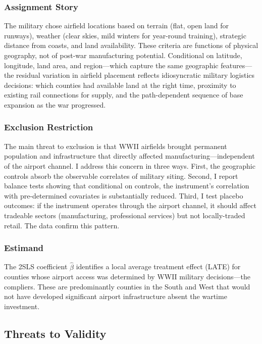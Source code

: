 \documentclass[12pt]{article}
\begin{document}
\subsubsection*{Assignment Story} The military chose airfield locations based on terrain (flat, open land for runways), weather (clear skies, mild winters for year-round training), strategic distance from coasts, and land availability. These criteria are functions of physical geography, not of post-war manufacturing potential. Conditional on latitude, longitude, land area, and region---which capture the same geographic features---the residual variation in airfield placement reflects idiosyncratic military logistics decisions: which counties had available land at the right time, proximity to existing rail connections for supply, and the path-dependent sequence of base expansion as the war progressed.

\subsubsection*{Exclusion Restriction} The main threat to exclusion is that WWII airfields brought permanent population and infrastructure that directly affected manufacturing---independent of the airport channel. I address this concern in three ways. First, the geographic controls absorb the observable correlates of military siting. Second, I report balance tests showing that conditional on controls, the instrument's correlation with pre-determined covariates is substantially reduced. Third, I test placebo outcomes: if the instrument operates through the airport channel, it should affect tradeable sectors (manufacturing, professional services) but not locally-traded retail. The data confirm this pattern.

\subsubsection*{Estimand} The 2SLS coefficient $\hat{\beta}$ identifies a local average treatment effect (LATE) for counties whose airport access was determined by WWII military decisions---the compliers. These are predominantly counties in the South and West that would not have developed significant airport infrastructure absent the wartime investment.

\subsection{Threats to Validity}
\end{document}
